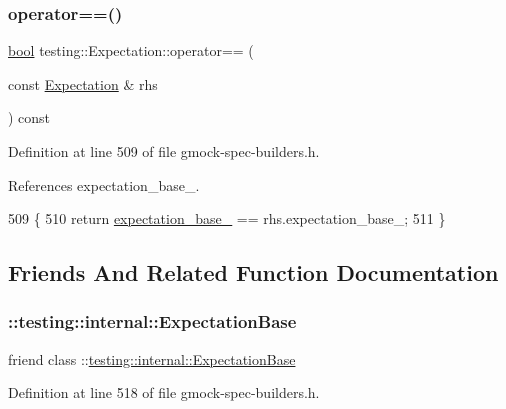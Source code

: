 \subsubsection{\texorpdfstring{operator==()}{operator==()}}
{\footnotesize\ttfamily \hyperlink{classbool}{bool} testing\+::\+Expectation\+::operator== (\begin{DoxyParamCaption}\item[{const \hyperlink{classtesting_1_1Expectation}{Expectation} \&}]{rhs }\end{DoxyParamCaption}) const\hspace{0.3cm}{\ttfamily [inline]}}



Definition at line 509 of file gmock-\/spec-\/builders.\+h.



References expectation\+\_\+base\+\_\+.


\begin{DoxyCode}
509                                                 \{
510     \textcolor{keywordflow}{return} \hyperlink{classtesting_1_1Expectation_a96caf8f40e769b68ea010c098f7190fa}{expectation\_base\_} == rhs.expectation\_base\_;
511   \}
\end{DoxyCode}


\subsection{Friends And Related Function Documentation}
\mbox{\label{classtesting_1_1Expectation_a9a45d4d807ed262ab76ab842b8d33761}} 
\subsubsection{\texorpdfstring{\+::testing\+::internal\+::\+Expectation\+Base}{::testing::internal::ExpectationBase}}
{\footnotesize\ttfamily friend class \+::\hyperlink{classtesting_1_1internal_1_1ExpectationBase}{testing\+::internal\+::\+Expectation\+Base}\hspace{0.3cm}{\ttfamily [friend]}}



Definition at line 518 of file gmock-\/spec-\/builders.\+h.

